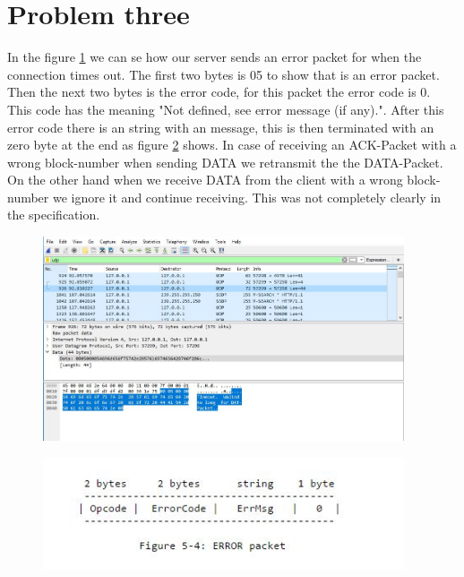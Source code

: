 \documentclass[a4paper,12pt]{article}
\numberwithin{figure}{section}
\begin{document}
\clearpage
\newpage

\section{Problem three}

In the figure \ref{error 0} we can se how our server sends an error packet for when the connection times out. The first two bytes is 05 to show that is an error packet. Then the next two bytes is the error code, for this packet the error code is 0. This code has the meaning "Not defined, see error message (if any)."\cite{RFC1350}. After this error code there is an string with an message, this is then terminated with an zero byte at the end as figure \ref{errorPacket} shows.
In case of receiving an ACK-Packet with a wrong block-number when sending DATA we retransmit the the DATA-Packet. On the other hand when we receive DATA from the client with a wrong block-number we ignore it and continue receiving. This was not completely clearly in the specification. \cite{RFC1350} 

\begin{figure}[h!]
	\centering
	\includegraphics[width=0.95\textwidth,keepaspectratio]{img/error0.jpg} 
	\caption{}
	\label{error 0}
\end{figure}
\begin{figure}[h!]
	\centering
	\includegraphics[width=0.95\textwidth,keepaspectratio]{img/errorPacket.jpg} 
	\caption{}
	\label{errorPacket}
\end{figure}
\end{document}
